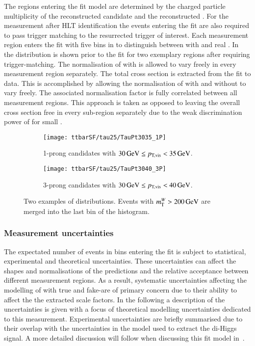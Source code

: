 The regions entering the fit model are determined by the charged
particle multiplicity of the reconstructed \tauhadvis candidate and
the reconstructed \tauhadvis \pT. For the measurement after HLT
\tauhadvis identification the events entering the fit are also
required to pass trigger matching to the resurrected trigger of
interest. Each measurement region enters the fit with five bins in
\mTW to distinguish between \ttbar with \faketauhadvis and real
\tauhadvis. In~ the \mTW
distribution is shown prior to the fit for two exemplary regions after
requiring trigger-matching.  The normalisation of \ttbar with
\faketauhadvis is allowed to vary freely in every measurement region
separately. The total \ttbar cross section is extracted from the fit
to data. This is accomplished by allowing the normalisation of \ttbar
with and without \faketauhadvis to vary freely. The associated
normalisation factor is fully correlated between all measurement
regions. This approach is taken as opposed to leaving the overall
\ttbar cross section free in every sub-region separately due to the
weak discrimination power of \mTW for small \tauhadvis \pT.


\begin{figure}[htbp]
  \centering

  \begin{subfigure}{.485\textwidth}
    \texttt{[image: ttbarSF/tau25/TauPt3035\_1P]}
    \caption{1-prong \tauhadvis candidates with
      $\SI{30}{\ensuremath{\text{GeV}}} \leq p_\text{T,vis} < \SI{35}{\ensuremath{\text{GeV}}}$.}
  \end{subfigure}\hfill%
  \begin{subfigure}{.485\textwidth}
    \texttt{[image: ttbarSF/tau25/TauPt3040\_3P]}
    \caption{3-prong \tauhadvis candidates with
      $\SI{30}{\GeV} \leq \pTvis < \SI{40}{\GeV}$.}
  \end{subfigure}

  \caption{Two examples of \mTW distributions. Events with
    $m_{\text{T}}^W > \SI{200}{\ensuremath{\text{GeV}}}$ are merged into the last bin of the
    histogram.}
  \label{fig:ttbarsf_mtw_examples_prefit}
\end{figure}


\subsubsection{Measurement uncertainties}

The expectated number of events in bins entering the fit is subject to
statistical, experimental and theoretical uncertainties. These
uncertainties can affect the shapes and normalisations of the
predictions and the relative acceptance between different measurement
regions. As a result, systematic uncertainties affecting the modelling
of \ttbar with true and fake-\tauhadvis are of primary concern due to
their ability to affect the the extracted scale factors. In the
following a description of the uncertainties is given with a focus of
theoretical modelling uncertainties dedicated to this
measurement. Experimental uncertainties are briefly summarised due to
their overlap with the uncertainties in the model used to extract the
di-Higgs signal. A more detailed discussion will follow when
discussing this fit model in~.

